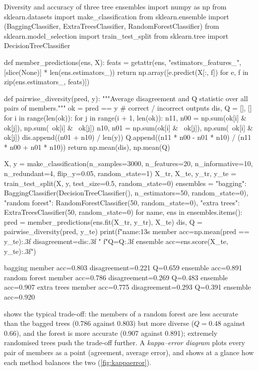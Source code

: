 \begin{pylisting}[label={lst:diversity}]{Diversity and accuracy of three tree ensembles}
import numpy as np
from sklearn.datasets import make_classification
from sklearn.ensemble import (BaggingClassifier, ExtraTreesClassifier,
                              RandomForestClassifier)
from sklearn.model_selection import train_test_split
from sklearn.tree import DecisionTreeClassifier

def member_predictions(ens, X):
    feats = getattr(ens, "estimators_features_", [slice(None)] * len(ens.estimators_))
    return np.array([e.predict(X[:, f]) for e, f in zip(ens.estimators_, feats)])

def pairwise_diversity(pred, y):
    """Average disagreement and Q statistic over all pairs of members."""
    ok = pred == y                                  # correct / incorrect outputs
    dis, Q = [], []
    for i in range(len(ok)):
        for j in range(i + 1, len(ok)):
            n11, n00 = np.sum(ok[i] & ok[j]), np.sum(~ok[i] & ~ok[j])
            n10, n01 = np.sum(ok[i] & ~ok[j]), np.sum(~ok[i] & ok[j])
            dis.append((n01 + n10) / len(y))
            Q.append((n11 * n00 - n01 * n10) / (n11 * n00 + n01 * n10))
    return np.mean(dis), np.mean(Q)

X, y = make_classification(n_samples=3000, n_features=20, n_informative=10, n_redundant=4,
                           flip_y=0.05, random_state=1)
X_tr, X_te, y_tr, y_te = train_test_split(X, y, test_size=0.5, random_state=0)
ensembles = {"bagging": BaggingClassifier(DecisionTreeClassifier(), n_estimators=50,
                                          random_state=0),
             "random forest": RandomForestClassifier(50, random_state=0),
             "extra trees": ExtraTreesClassifier(50, random_state=0)}
for name, ens in ensembles.items():
    pred = member_predictions(ens.fit(X_tr, y_tr), X_te)
    dis, Q = pairwise_diversity(pred, y_te)
    print(f"{name:13s} member acc={np.mean(pred == y_te):.3f}  disagreement={dis:.3f}  "
          f"Q={Q:.3f}  ensemble acc={ens.score(X_te, y_te):.3f}")
\end{pylisting}
\begin{pyoutput}
bagging       member acc=0.803  disagreement=0.221  Q=0.659  ensemble acc=0.891
random forest member acc=0.786  disagreement=0.269  Q=0.483  ensemble acc=0.907
extra trees   member acc=0.775  disagreement=0.293  Q=0.391  ensemble acc=0.920
\end{pyoutput}

 shows the typical trade-off: the members of a random forest are less
accurate than the bagged trees (0.786 against 0.803) but more diverse ($Q=0.48$ against 0.66),
and the forest is more accurate (0.907 against 0.891); extremely randomised trees push the
trade-off further. A \emph{kappa--error diagram} \citep{margineantu1997pruning} plots every pair
of members as a point (agreement, average error), and shows at a glance how each method
balances the two (\cref{fig:kappaerror}).


